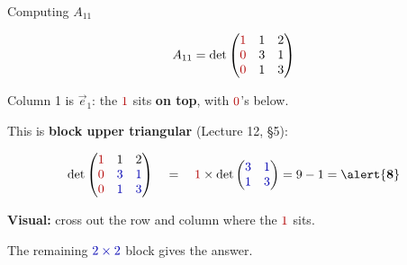 \documentclass[10pt]{beamer}
\theoremstyle{definition}
\newcommand{\x}[1]{\alert{\textbf{#1}}}
\newcommand{\rd}[1]{{\color{red!70!black}#1}}
\newcommand{\bl}[1]{{\color{blue!70!black}#1}}
\begin{document}
\begin{frame}{Computing $A_{11}$}

$$
A_{11} = \det\begin{pmatrix} \rd{1} & 1 & 2 \\ \rd{0} & 3 & 1 \\ \rd{0} & 1 & 3 \end{pmatrix}
$$

\vfill

Column 1 is $\vec{e}_1$: the $\rd{1}$ sits \x{on top}, with $\rd{0}$'s below.

This is \x{block upper triangular} (Lecture 12, \S5):

\vfill

$$
\det\begin{pmatrix} \rd{1} & 1 & 2 \\ \rd{0} & \bl{3} & \bl{1} \\ \rd{0} & \bl{1} & \bl{3} \end{pmatrix}
\quad = \quad
\rd{1} \times \det\begin{pmatrix} \bl{3} & \bl{1} \\ \bl{1} & \bl{3} \end{pmatrix}
= 9 - 1 = \x{8}
$$

\begin{center}
\textbf{Visual:} cross out the row and column where the $\rd{1}$ sits.

The remaining $\bl{2\times 2}$ block gives the answer.
\end{center}

\end{frame}
\end{document}
